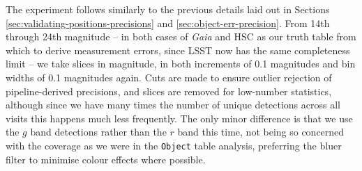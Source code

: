 \documentclass[SE,lsstdraft,authoryear,toc]{lsstdoc}
\begin{document}
The experiment follows similarly to the previous details laid out in Sections \ref{sec:validating-positions-precisions} and \ref{sec:object-err-precision}.
From 14th through 24th magnitude -- in both cases of \textit{Gaia} and HSC as our truth table from which to derive measurement errors, since LSST now has the same completeness limit -- we take slices in magnitude, in both increments of 0.1 magnitudes and bin widths of 0.1 magnitudes again.
Cuts are made to ensure outlier rejection of pipeline-derived precisions, and slices are removed for low-number statistics, although since we have many times the number of unique detections across all visits this happens much less frequently.
The only minor difference is that we use the $g$ band detections rather than the $r$ band this time, not being so concerned with the coverage as we were in the \texttt{Object} table analysis, preferring the bluer filter to minimise colour effects where possible.
\end{document}
